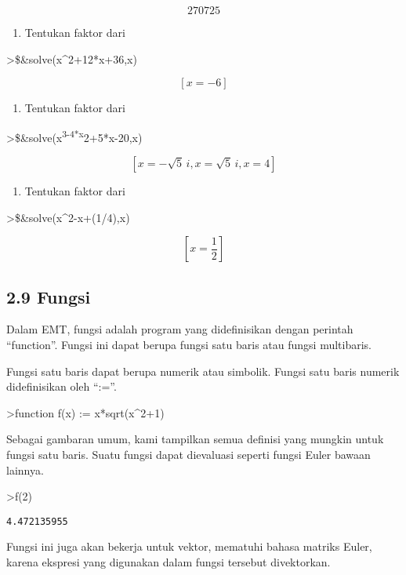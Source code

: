 \documentclass[
]{book}
\providecommand{\tightlist}{%
  \setlength{\itemsep}{0pt}\setlength{\parskip}{0pt}}
\begin{document}
\[270725\]

\begin{enumerate}
\def\labelenumi{\arabic{enumi}.}
\setcounter{enumi}{2}
\tightlist
\item
  Tentukan faktor dari
\end{enumerate}

\textgreater\$\&solve(x\^{}2+12*x+36,x)

\[\left[ x=-6 \right]\]

\begin{enumerate}
\def\labelenumi{\arabic{enumi}.}
\setcounter{enumi}{3}
\tightlist
\item
  Tentukan faktor dari
\end{enumerate}

\textgreater\$\&solve(x\textsuperscript{3-4*x}2+5*x-20,x)

\[\left[ x=-\sqrt{5}\,i , x=\sqrt{5}\,i , x=4 \right]\]

\begin{enumerate}
\def\labelenumi{\arabic{enumi}.}
\setcounter{enumi}{4}
\tightlist
\item
  Tentukan faktor dari
\end{enumerate}

\textgreater\$\&solve(x\^{}2-x+(1/4),x)

\[\left[ x=\frac{1}{2} \right]\]

\subsection{2.9 Fungsi}\label{fungsi}

Dalam EMT, fungsi adalah program yang didefinisikan dengan perintah ``function''. Fungsi ini dapat berupa fungsi satu baris atau fungsi multibaris.

Fungsi satu baris dapat berupa numerik atau simbolik. Fungsi satu baris numerik didefinisikan oleh ``:=''.

\textgreater function f(x) := x*sqrt(x\^{}2+1)

Sebagai gambaran umum, kami tampilkan semua definisi yang mungkin untuk fungsi satu baris. Suatu fungsi dapat dievaluasi seperti fungsi Euler bawaan lainnya.

\textgreater f(2)

\begin{verbatim}
4.472135955
\end{verbatim}

Fungsi ini juga akan bekerja untuk vektor, mematuhi bahasa matriks Euler, karena ekspresi yang digunakan dalam fungsi tersebut divektorkan.
\end{document}
